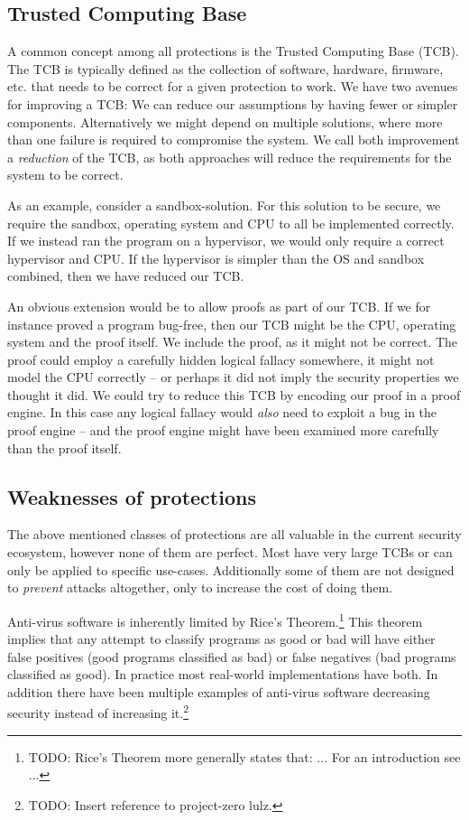 \subsection{Trusted Computing Base}
A common concept among all protections is the Trusted Computing Base
  (TCB). The TCB is typically defined as the collection of software, hardware,
firmware, etc. that needs to be correct for a given protection to work. We have
two avenues for improving a TCB: We can reduce our assumptions by having fewer
or simpler components. Alternatively we might depend on multiple solutions,
where more than one failure is required to compromise the system. We call both
improvement a \emph{reduction} of the TCB, as both approaches will reduce the
requirements for the system to be correct.

As an example, consider a sandbox-solution. For this solution to be secure, we
require the sandbox, operating system and CPU to all be implemented
correctly. If we instead ran the program on a hypervisor, we would only require
a correct hypervisor and CPU. If the hypervisor is simpler than the OS and
sandbox combined, then we have reduced our TCB.

An obvious extension would be to allow proofs as part of our TCB. If we for
instance proved a program bug-free, then our TCB might be the CPU, operating
system and the proof itself. We include the proof, as it might not be
correct. The proof could employ a carefully hidden logical fallacy somewhere, it
might not model the CPU correctly -- or perhaps it did not imply the security
properties we thought it did. We could try to reduce this TCB by encoding our
proof in a proof engine. In this case any logical fallacy would \emph{also} need
to exploit a bug in the proof engine -- and the proof engine might have been
examined more carefully than the proof itself.

\subsection{Weaknesses of protections}
The above mentioned classes of protections are all valuable in the current
security ecosystem, however none of them are perfect. Most have very large TCBs
or can only be applied to specific use-cases. Additionally some of them are not
designed to \emph{prevent} attacks altogether, only to increase the cost of
doing them.

Anti-virus software is inherently limited by Rice's Theorem.\footnote{TODO:
  Rice's Theorem more generally states that: ... For an introduction see ...}
This theorem implies that any attempt to classify programs as good or bad will
have either false positives (good programs classified as bad) or false negatives
(bad programs classified as good). In practice most real-world implementations
have both. In addition there have been multiple examples of anti-virus software
decreasing security instead of increasing it.\footnote{TODO: Insert reference to
  project-zero lulz.}

